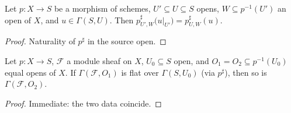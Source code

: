 \begin{lemma}
  \label{mk-lem:appLE_base_res_apply}
  \leanok

  Let \(p : X \to S\) be a morphism of schemes, \(U' \subseteq U \subseteq S\)
  opens, \(W \subseteq p^{-1}(U')\) an open of \(X\), and
  \(u \in \Gamma(S, U)\). Then
  \(p^\sharp_{U',W}\bigl(u|_{U'}\bigr) = p^\sharp_{U,W}(u)\).
\end{lemma}
\begin{proof}
  \leanok
  Naturality of \(p^\sharp\) in the source open.
\end{proof}

\begin{lemma}
  \label{mk-lem:flat_sections_congr}
  \leanok

  Let \(p : X \to S\), \(\mathcal F\) a module sheaf on \(X\),
  \(U_0 \subseteq S\) open, and \(O_1 = O_2 \subseteq p^{-1}(U_0)\) equal
  opens of \(X\). If \(\Gamma(\mathcal F, O_1)\) is flat over
  \(\Gamma(S, U_0)\) (via \(p^\sharp\)), then so is
  \(\Gamma(\mathcal F, O_2)\).
\end{lemma}
\begin{proof}
  \leanok
  Immediate: the two data coincide.
\end{proof}

